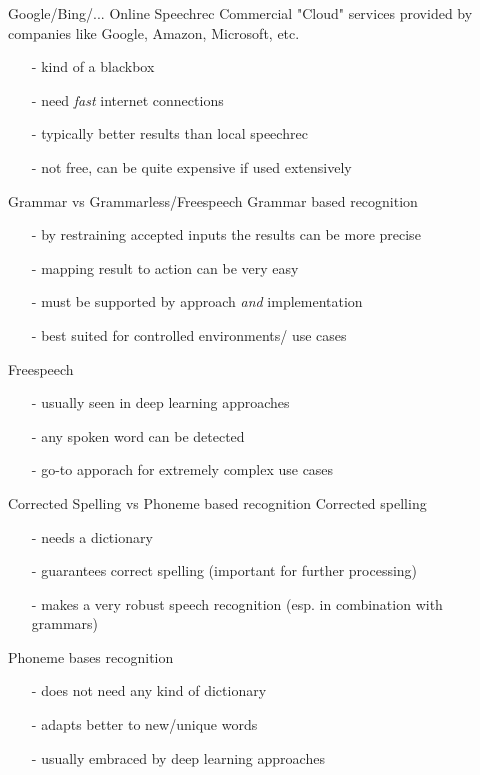 \documentclass{beamer}
\begin{document}
	\begin{frame}{Google/Bing/... Online Speechrec}
		Commercial "Cloud" services provided by companies like Google, Amazon, Microsoft, etc.
		\begin{itemize}
			\item[-] kind of a blackbox
			\item[-] need \emph{fast} internet connections
			\item[-] typically better results than local speechrec
			\item[-] not free, can be quite expensive if used extensively
		\end{itemize}
	\end{frame}
	
	
	\begin{frame}{Grammar vs Grammarless/Freespeech}
		Grammar based recognition
		\begin{itemize}
			\item[-] by restraining accepted inputs the results can be more precise
			\item[-] mapping result to action can be very easy
			\item[-] must be supported by approach \emph{and} implementation
			\item[-] best suited for controlled environments/ use cases
		\end{itemize}
		Freespeech
		\begin{itemize}
			\item[-] usually seen in deep learning approaches
			\item[-] any spoken word can be detected
			\item[-] go-to apporach for extremely complex use cases
		\end{itemize}
	\end{frame}
	
	\begin{frame}{Corrected Spelling vs Phoneme based recognition}
		Corrected spelling
		\begin{itemize}
			\item[-] needs a dictionary
			\item[-] guarantees correct spelling (important for further processing)
			\item[-] makes a very robust speech recognition (esp. in combination with grammars)
		\end{itemize}
		Phoneme bases recognition
		\begin{itemize}
			\item[-] does not need any kind of dictionary
			\item[-] adapts better to new/unique words
			\item[-] usually embraced by deep learning approaches
		\end{itemize}
	\end{frame}
	
\end{document}
